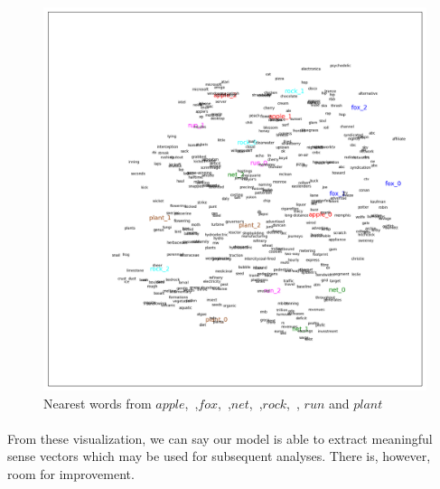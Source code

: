 \begin{figure}[tb]
  \centering
	\includegraphics[width=1.0\textwidth]{some20} 
	\caption{Nearest words from $apple$,\ ,$fox$,\ ,$net$,\ ,$rock$,\  , $run$ and $plant$}
	\label{fig:keywords20}
\end{figure}

\paragraph{} From these visualization, we can say our model is able to extract meaningful sense vectors which may be used for subsequent analyses. There is, however, room for improvement.
